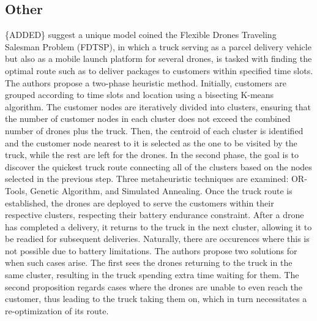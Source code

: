 \documentclass{article}
\begin{document}
	\subsection{Other}
	\{ADDED\}
	 \citeauthor{Lu2022} \cite{Lu2022} suggest a unique model coined the Flexible Drones Traveling Salesman Problem (FDTSP), in which a truck serving as a parcel delivery vehicle but also as a mobile launch platform for several drones, is tasked with finding the optimal route such as to deliver packages to customers within specified time slots. The authors propose a two-phase heuristic method. Initially, customers are grouped according to time slots and location using a bisecting K-means algorithm. The customer nodes are iteratively divided into clusters, ensuring that the number of customer nodes in each cluster does not exceed the combined number of drones plus the truck. Then, the centroid of each cluster is identified and the customer node nearest to it is selected as the one to be visited by the truck, while the rest are left for the drones. In the second phase, the goal is to discover the quickest truck route connecting all of the clusters based on the nodes selected in the previous step. Three metaheuristic techniques are examined: OR-Tools, Genetic Algorithm, and Simulated Annealing. Once the truck route is established, the drones are deployed to serve the customers within their respective clusters, respecting their battery endurance constraint. After a drone has completed a delivery, it returns to the truck in the next cluster, allowing it to be readied for subsequent deliveries. Naturally, there are occurences where this is not possible due to battery limitations. The authors propose two solutions for when such cases arise. The first sees the drones returning to the truck in the same cluster, resulting in the truck spending extra time waiting for them. The second proposition regards cases where the drones are unable to even reach the customer, thus leading to the truck taking them on, which in turn necessitates a re-optimization of its route.
	 \par
\end{document}
